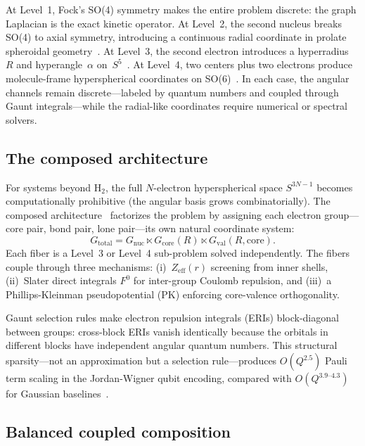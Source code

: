 \documentclass[aps,pra,twocolumn,superscriptaddress,longbibliography]{revtex4-2}
\begin{document}
At Level~1, Fock's SO(4) symmetry makes the entire problem discrete:
the graph Laplacian is the exact kinetic operator.  At Level~2, the
second nucleus breaks SO(4) to axial symmetry, introducing a continuous
radial coordinate in prolate spheroidal geometry~\cite{Paper11}.  At
Level~3, the second electron introduces a hyperradius~$R$ and
hyperangle~$\alpha$ on~$S^5$~\cite{Paper13}.  At Level~4, two centers
plus two electrons produce molecule-frame hyperspherical coordinates on
SO(6)~\cite{Paper15}.  In each case, the angular channels remain
discrete---labeled by quantum numbers and coupled through Gaunt
integrals---while the radial-like coordinates require numerical or
spectral solvers.

\subsection{The composed architecture}

For systems beyond H$_2$, the full $N$-electron hyperspherical space
$S^{3N-1}$ becomes computationally prohibitive (the angular basis grows
combinatorially).  The composed architecture~\cite{Paper17} factorizes
the problem by assigning each electron group---core pair, bond pair,
lone pair---its own natural coordinate system:
\begin{equation}
G_{\text{total}} = G_{\text{nuc}} \ltimes G_{\text{core}}(R)
\ltimes G_{\text{val}}(R, \text{core}).
\label{eq:composed_bundle}
\end{equation}
Each fiber is a Level~3 or Level~4 sub-problem solved independently.
The fibers couple through three mechanisms: (i)~$Z_{\text{eff}}(r)$
screening from inner shells, (ii)~Slater direct integrals $F^0$ for
inter-group Coulomb repulsion, and (iii)~a Phillips-Kleinman
pseudopotential (PK) enforcing core-valence orthogonality.

Gaunt selection rules make electron repulsion integrals (ERIs)
block-diagonal between groups: cross-block ERIs vanish identically
because the orbitals in different blocks have independent angular
quantum numbers.  This structural sparsity---not an approximation but
a selection rule---produces $O(Q^{2.5})$ Pauli term scaling in the
Jordan-Wigner qubit encoding, compared with $O(Q^{3.9\text{--}4.3})$
for Gaussian baselines~\cite{Paper14}.

\subsection{Balanced coupled composition}
\end{document}
